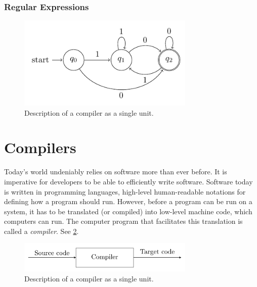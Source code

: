 \subsubsection{Regular Expressions} 

\begin{definition}
  \label{def:regular_exp}
\end{definition}






\begin{figure}[h]
  \label{fig:dfa}
  \centering
  \includegraphics[width=0.75\textwidth]{figures/dfa.pdf}
  \caption{Description of a compiler as a single unit.}
\end{figure}



  


\section{Compilers}


Today's world undeniably relies on software more than ever before. It is imperative for developers to be able to efficiently write software. Software today is written in programming languages, high-level human-readable notations for defining how a program should run. However, before a program can be run on a system, it has to be translated (or compiled) into low-level machine code, which computers can run. The computer program that facilitates this translation is called a \emph{compiler}. See \cref{fig:compiler}.

\begin{figure}[h]
  \label{fig:compiler}
  \centering
  \includegraphics[width=0.75\textwidth]{figures/compiler.pdf}
  \caption{Description of a compiler as a single unit.}
\end{figure}



